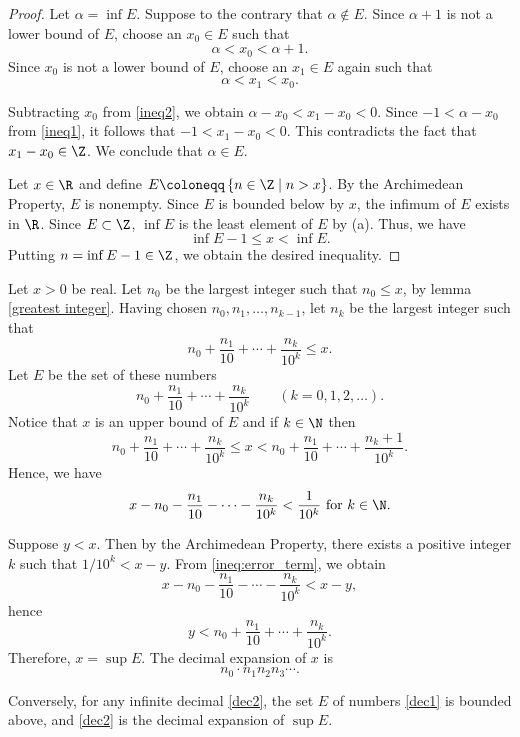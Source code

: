 \begin{proof}
\item[(a)] Let $\alpha = \inf E$.
Suppose to the contrary that $\alpha \notin E$. 
Since $\alpha+1$ is not a lower bound of $E$, choose an $x_0 \in E$ such that 
\begin{equation}\label{ineq1}
    \alpha<x_0<\alpha+1.
\end{equation}
Since $x_0$ is not a lower bound of $E$, choose an $x_1 \in E$ again such that
\begin{equation}\label{ineq2}
    \alpha<x_1<x_0.
\end{equation}

Subtracting $x_0$ from \eqref{ineq2}, we obtain $\alpha-x_0<x_1-x_0<0$. 
Since $-1<\alpha-x_0$ from \eqref{ineq1}, it follows that $-1<x_1-x_0<0$.
This contradicts the fact that $x_1-x_0 \in \Z$.
We conclude that $\alpha \in E$.
\item[(b)] Let $x \in \R$ and define $E \coloneqq \left\{n \in \Z \mid n>x \right\}$.
By the Archimedean Property, $E$ is nonempty. 
Since $E$ is bounded below by $x$, the infimum of $E$ exists in $\R$. 
Since $E \subset \Z$, $\inf E$ is the least element of $E$ by (a).
Thus, we have \[\inf E -1 \leq x < \inf E.\]
Putting $n= \inf E -1 \in \Z$, we obtain the desired inequality.
\end{proof}
\begin{remark}[Decimals]
Let $x>0$ be real. 
Let $n_0$ be the largest integer such that $n_0 \leq x$, by lemma \ref{greatest integer}.
Having chosen $n_0, n_1, \ldots, n_{k-1}$, let $n_k$ be the largest integer such that 
\[
n_0 + \frac{n_1}{10} + \cdots + \frac{n_k}{10^k} \leq x.
\]
Let $E$ be the set of these numbers 
\begin{equation} \label{dec1}
n_0 + \frac{n_1}{10} + \cdots + \frac{n_k}{10^k} \qquad (k=0, 1, 2, \ldots).
\end{equation}
Notice that $x$ is an upper bound of $E$ and if $k \in \N$ then
\[
n_0 + \frac{n_1}{10} + \cdots + \frac{n_k}{10^k} \leq x < n_0 + \frac{n_1}{10} + \cdots + \frac{n_k+1}{10^k}.
\]
Hence, we have
\begin{equation} \label{ineq:error_term}
x - n_0 - \frac{n_1}{10} - \cdots - \frac{n_k}{10^k} < \frac{1}{10^k} \text{ for } k  \in \N.
\end{equation}

Suppose $y<x$. Then by the Archimedean Property, there exists a positive integer $k$ such that $1/10^k<x-y$.
From \eqref{ineq:error_term}, we obtain 
\[
x - n_0 - \frac{n_1}{10} - \cdots - \frac{n_k}{10^k}<x-y,
\]
hence 
\[
y<n_0 + \frac{n_1}{10} + \cdots + \frac{n_k}{10^k}.
\]
Therefore, $x=\sup E$. The decimal expansion of $x$ is 
\begin{equation} \label{dec2}
n_0 \cdot n_1 n_2 n_3 \cdots .
\end{equation}

Conversely, for any infinite decimal \eqref{dec2}, the set $E$ of numbers \eqref{dec1} is bounded above, and \eqref{dec2} is the decimal expansion of $\sup E$.
\end{remark}
